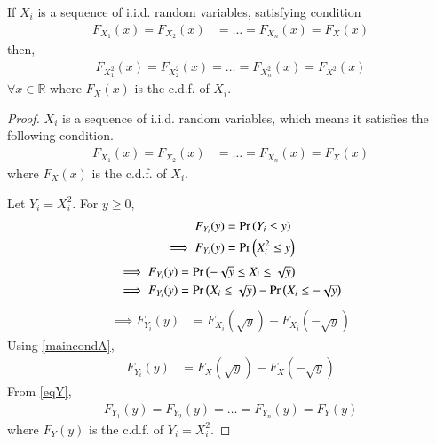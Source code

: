 \documentclass[journal,12pt,twocolumn]{IEEEtran}
\begin{document}
\begin{lemma} \label{lmaconda}
    If $X_i$ is a sequence of i.i.d. random variables, satisfying condition
    \begin{align}
        F_{X_1}(x)=F_{X_2}(x)&=\ldots=F_{X_n}(x)=F_X(x)
    \end{align}
    then,
    \begin{align}
        F_{X_1^2}(x)=F_{X_2^2}(x)=\ldots=F_{X_n^2}(x)=F_{X^2}(x)
    \end{align}
    $\forall x \in \mathbb{R}$ where $F_{X}(x)$ is the c.d.f. of $X_i$.
\end{lemma}
\begin{proof}
${X_i}$ is a sequence of i.i.d. random variables, which means it satisfies the following condition.
\begin{align}
        F_{X_1}(x)=F_{X_2}(x)&=\ldots=F_{X_n}(x)=F_X(x) \label{maincondA}
\end{align}
where $F_X(x)$ is the c.d.f. of $X_i$.

Let $Y_i=X_i^2$. For $y \geq 0$,
\begin{align}
    F_{Y_i}(y)&=\Pr\left(Y_i \leq y\right)\\
    \implies F_{Y_i}(y)&=\Pr\left(X_i^2 \leq y\right)
\end{align}
\begin{align}
    \implies F_{Y_i}(y)&=\Pr\left(-\sqrt{y} \leq X_i \leq \sqrt{y}\right)\label{eqref}\\
    \implies F_{Y_i}(y)&=\Pr\left(X_i \leq \sqrt{y}\right)-\Pr\left(X_i \leq -\sqrt{y}\right)
\end{align}
\begin{align}
\implies F_{Y_i}(y)&=F_{X_i}(\sqrt{y})-F_{X_i}(-\sqrt{y})
\end{align}
Using \eqref{maincondA},
\begin{align} 
    F_{Y_i}(y)&=F_X(\sqrt{y})-F_X(-\sqrt{y})\label{eqY}
\end{align}
From \eqref{eqY},
\begin{align} 
    F_{Y_1}(y)=F_{Y_2}(y)=\ldots=F_{Y_n}(y)=F_Y(y)\label{condnA}
\end{align}
where $F_Y(y)$ is the c.d.f. of $Y_i=X_i^2$.
\end{proof}
\end{document}
